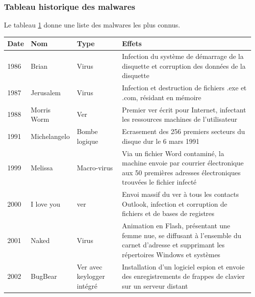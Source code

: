 \subsubsection{Tableau historique des malwares}
Le tableau \ref{malware} donne une liste des malwares les plus connus.
\begin{table}[H]
\begin{tabular}{|p{1.5cm}|p{2cm}|p{2cm}|p{9cm}|}
\hline \textbf{Date} &  \textbf{Nom} & \textbf{Type} & \textbf{Effets} \\
\hline 1986 & Brian & Virus & Infection du système de démarrage de la disquette et corruption des données de la disquette \\
\hline 1987 & Jerusalem & Virus & Infection et destruction de fichiers .exe et .com, résidant en mémoire\\
\hline 1988 & Morris Worm & Ver & Premier ver écrit pour Internet, infectant les ressources machines de l'utilisateur \\
\hline 1991 & Michelangelo & Bombe logique & Ecrasement des 256 premiers secteurs du disque dur le 6 mars 1991 \\
\hline 1999 & Melissa & Macro-virus & Via un fichier Word contaminé, la machine envoie par courrier électronique aux 50 premières adresses électroniques trouvées le fichier infecté\\
\hline 2000 & I love you & ver & Envoi massif du ver à tous les contacts Outlook, infection et corruption de fichiers et de bases de registres \\
\hline 2001 & Naked & Virus & Animation en Flash, présentant une femme nue, se diffusant à l'ensemble du carnet d'adresse et supprimant les répertoires Windows et systèmes \\
\hline 2002 & BugBear & Ver avec keylogger intégré & Installation d'un logiciel espion et envoie des enregistrements de frappes de clavier sur un serveur distant \\
\hline
\end{tabular}
\label{malware}
\end{table}
